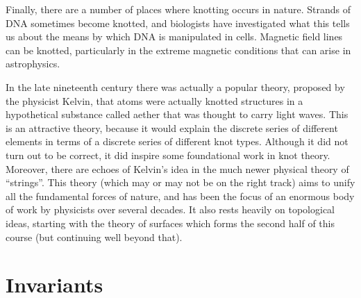 \documentclass[reqno]{amsart}
\theoremstyle{definition}
\begin{document}
Finally, there are a number of places where knotting occurs in
nature.  Strands of DNA sometimes become knotted, and biologists have
investigated what this tells us about the means by which DNA is
manipulated in cells.  Magnetic field lines can be knotted,
particularly in the extreme magnetic conditions that can arise in
astrophysics.

In the late nineteenth century there was actually a popular theory,
proposed by the physicist Kelvin, that atoms were actually knotted
structures in a hypothetical substance called aether that was thought
to carry light waves.  This is an attractive theory, because it would
explain the discrete series of different elements in terms of a
discrete series of different knot types.  Although it did not turn out
to be correct, it did inspire some foundational work in knot theory.
Moreover, there are echoes of Kelvin's idea in the much newer physical
theory of ``strings''.  This theory (which may or may not be on the
right track) aims to unify all the fundamental forces of nature, and
has been the focus of an enormous body of work by physicists over
several decades.  It also rests heavily on topological ideas, starting
with the theory of surfaces which forms the second half of this course
(but continuing well beyond that).

\section{Invariants}
\label{sec-invariants}
\end{document}
